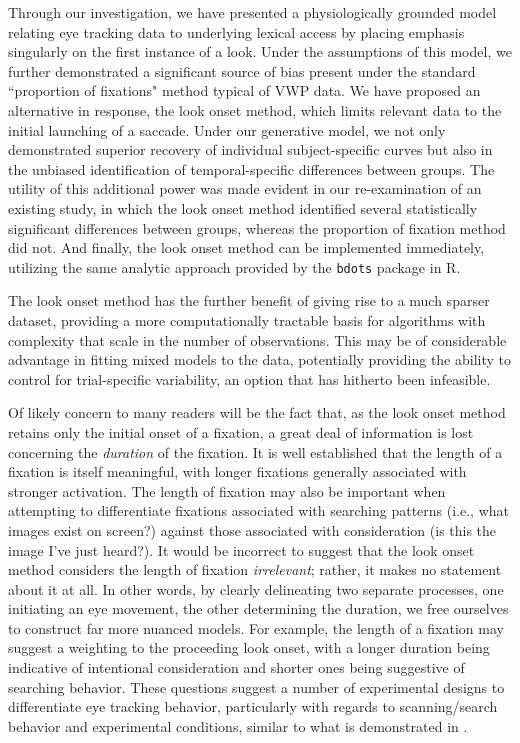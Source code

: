 \documentclass{article}
\newcommand{\xt}{\texttt}
\begin{document}
Through our investigation, we have presented a physiologically grounded model relating eye tracking data to underlying lexical access by placing emphasis singularly on the first instance of a look. Under the assumptions of this model, we further demonstrated a significant source of bias present under the standard ``proportion of fixations" method typical of VWP data. We have proposed an alternative in response, the look onset method, which limits relevant data to the initial launching of a saccade. Under our generative model, we not only demonstrated superior recovery of individual subject-specific curves but also in the unbiased identification of temporal-specific differences between groups. The utility of this additional power was made evident in our re-examination of an existing study, in which the look onset method identified several statistically significant differences between groups, whereas the proportion of fixation method did not. And finally, the look onset method can be implemented immediately, utilizing the same analytic approach provided by the \xt{bdots} package in R.

The look onset method has the further benefit of giving rise to a much sparser dataset, providing a more computationally tractable basis for algorithms with complexity that scale in the number of observations. This may be of considerable advantage in fitting mixed models to the data, potentially providing the ability to control for trial-specific variability, an option that has hitherto been infeasible. 

Of likely concern to many readers will be the fact that, as the look onset method retains only the initial onset of a fixation, a great deal of information is lost concerning the \textit{duration} of the fixation. It is well established \citep{Salthouse1980} that the length of a fixation is itself meaningful, with longer fixations generally associated with stronger activation. The length of fixation may also be important when attempting to differentiate fixations associated with searching patterns (i.e., what images exist on screen?) against those associated with consideration (is this the image I've just heard?). It would be incorrect to suggest that the look onset method considers the length of fixation \textit{irrelevant}; rather, it makes no statement about it at all. In other words, by clearly delineating two separate processes, one initiating an eye movement, the other determining the duration, we free ourselves to construct far more nuanced models. For example, the length of a fixation may suggest a weighting to the proceeding look onset, with a longer duration being indicative of intentional consideration and shorter ones being suggestive of searching behavior. These questions suggest a number of experimental designs to differentiate eye tracking behavior, particularly with regards to scanning/search behavior and experimental conditions, similar to what is demonstrated in \citet{Apfelbaum2021}.
\end{document}
